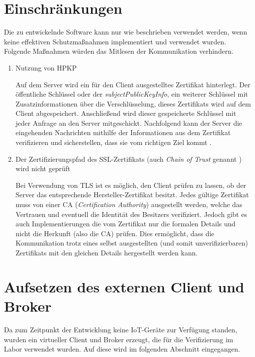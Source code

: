 \section{Einschränkungen}
Die zu entwickelnde Software kann nur wie beschrieben verwendet werden, wenn keine effektiven Schutzmaßnahmen implementiert und verwendet wurden.
Folgende Maßnahmen würden das Mitlesen der Kommunikation verhindern.
\begin{enumerate}
    \item Nutzung von \ac{HPKP}
    
    Auf dem Server wird ein für den Client ausgestelltes Zertifikat hinterlegt. Der öffentliche Schlüssel oder der \emph{subjectPublicKeyInfo}, ein weiterer Schlüssel mit Zusatzinformationen über die Verschlüsselung, dieses Zertifikats wird auf dem Client abgespeichert. Anschließend wird dieser gespeicherte Schlüssel mit jeder Anfrage an den Server mitgeschickt. Nachfolgend kann der Server die eingehenden Nachrichten mithilfe der Informationen aus dem Zertifikat verifizieren und sicherstellen, dass sie vom richtigen Ziel kommt \cite{evans_palmer_sleevi_2015}.
    
    \item Der Zertifizierungspfad des SSL-Zertifikats (auch \emph{Chain of Trust} genannt \cite{georgiev2012most}) wird nicht geprüft
    
    Bei Verwendung von TLS ist es möglich, den Client prüfen zu lassen, ob der Server das entsprechende Hersteller-Zertifikat besitzt. Jedes gültige Zertifikat muss von einer \ac{CA} (\emph{Certification Authority}) ausgestellt werden, welche das Vertrauen und eventuell die Identität des Besitzers verifiziert. Jedoch gibt es auch Implementierungen die vom Zertifikat nur die formalen Details und nicht die Herkunft (also die \ac{CA}) prüfen.
    Dies ermöglicht, dass die Kommunikation trotz eines selbst ausgestellten (und somit unverifizierbaren) Zertifikats mit den gleichen Details hergestellt werden kann.
\end{enumerate}


\section{Aufsetzen des externen Client und Broker}
    Da zum Zeitpunkt der Entwicklung keine \ac{IoT}-Geräte zur Verfügung standen, wurden ein virtueller Client und Broker erzeugt, die für die Verifizierung im Labor verwendet wurden.
    Auf diese wird im folgenden Abschnitt eingegangen.

